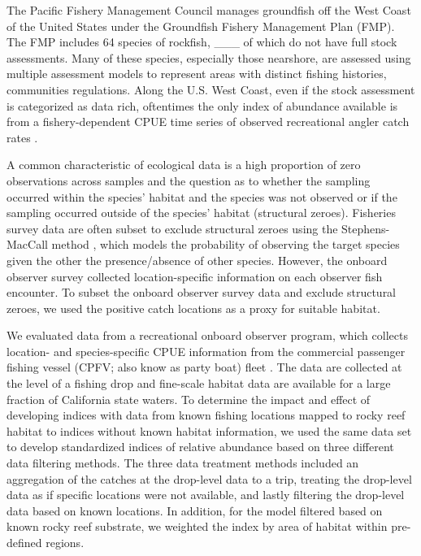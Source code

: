 \documentclass[
  authoryear,
  preprint,
  3p]{elsarticle}
\begin{document}
The Pacific Fishery Management Council manages groundfish off the West
Coast of the United States under the Groundfish Fishery Management Plan
(FMP). The FMP includes 64 species of rockfish, \_\_\_ of which do not
have full stock assessments. Many of these species, especially those
nearshore, are assessed using multiple assessment models to represent
areas with distinct fishing histories, communities regulations. Along
the U.S. West Coast, even if the stock assessment is categorized as data
rich, oftentimes the only index of abundance available is from a
fishery-dependent CPUE time series of observed recreational angler catch
rates \citep{Cope:2013:ISC}.

A common characteristic of ecological data is a high proportion of zero
observations across samples and the question as to whether the sampling
occurred within the species' habitat and the species was not observed or
if the sampling occurred outside of the species' habitat (structural
zeroes). Fisheries survey data are often subset to exclude structural
zeroes using the Stephens-MacCall method
\citeyearpar{Stephens:2004:MAS}, which models the probability of
observing the target species given the other the presence/absence of
other species. However, the onboard observer survey collected
location-specific information on each observer fish encounter. To subset
the onboard observer survey data and exclude structural zeroes, we used
the positive catch locations as a proxy for suitable habitat.

We evaluated data from a recreational onboard observer program, which
collects location- and species-specific CPUE information from the
commercial passenger fishing vessel (CPFV; also know as party boat)
fleet \citep{Monk:2014:DRD}. The data are collected at the level of a
fishing drop and fine-scale habitat data are available for a large
fraction of California state waters. To determine the impact and effect
of developing indices with data from known fishing locations mapped to
rocky reef habitat to indices without known habitat information, we used
the same data set to develop standardized indices of relative abundance
based on three different data filtering methods. The three data
treatment methods included an aggregation of the catches at the
drop-level data to a trip, treating the drop-level data as if specific
locations were not available, and lastly filtering the drop-level data
based on known locations. In addition, for the model filtered based on
known rocky reef substrate, we weighted the index by area of habitat
within pre-defined regions.
\end{document}

